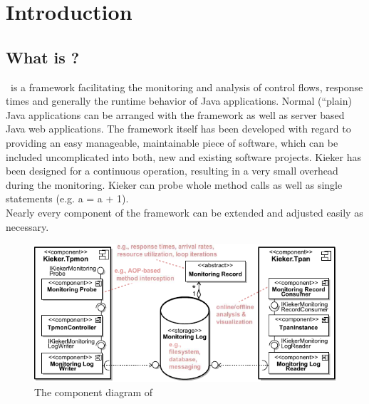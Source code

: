 \chapter{Introduction}
	\section{What is \Kieker?}

		\Kieker\ is a framework facilitating the monitoring and analysis of control flows, response times and generally the runtime behavior of Java applications. Normal ({}``plain) Java applications can be arranged with the framework as well as server based Java web applications. The framework itself has been developed with regard to providing an easy manageable, maintainable piece of software, which can be included uncomplicated into both, new and existing software projects. Kieker has been designed for a continuous operation, resulting in a very small overhead during the monitoring. Kieker can probe whole method calls as well as single statements (e.g. a = a + 1).\\ 
		Nearly every component of the framework can be extended and adjusted easily as necessary.

		\begin{figure}[H]
			\begin{centering}
				\includegraphics[width=1\textwidth]{images/kiekerComponentDiagram}
			\end{centering}
			\caption{The component diagram of \Kieker}
			\label{Figure:KiekerComponentDiagram}
		\end{figure}
		
